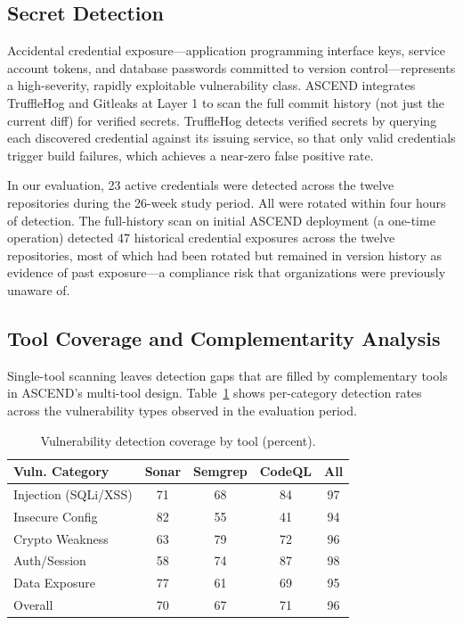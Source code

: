\documentclass{ieeeaccess}
\begin{document}
\subsection{Secret Detection}
Accidental credential exposure---application programming interface keys, service account tokens, and database passwords committed to version control---represents a high-severity, rapidly exploitable vulnerability class. ASCEND integrates TruffleHog and Gitleaks at Layer 1 to scan the full commit history (not just the current diff) for verified secrets. TruffleHog detects verified secrets by querying each discovered credential against its issuing service, so that only valid credentials trigger build failures, which achieves a near-zero false positive rate.

In our evaluation, 23 active credentials were detected across the twelve repositories during the 26-week study period. All were rotated within four hours of detection. The full-history scan on initial ASCEND deployment (a one-time operation) detected 47 historical credential exposures across the twelve repositories, most of which had been rotated but remained in version history as evidence of past exposure---a compliance risk that organizations were previously unaware of.

\subsection{Tool Coverage and Complementarity Analysis}
Single-tool scanning leaves detection gaps that are filled by complementary tools in ASCEND's multi-tool design. Table~\ref{tab:coverage} shows per-category detection rates across the vulnerability types observed in the evaluation period.

\begin{table}[!t]
\caption{Vulnerability detection coverage by tool (percent).}
\label{tab:coverage}
\centering
\begin{tabular}{lcccc}
\hline
\textbf{Vuln. Category} & \textbf{Sonar} & \textbf{Semgrep} & \textbf{CodeQL} & \textbf{All} \\
\hline
Injection (SQLi/XSS) & 71 & 68 & 84 & 97 \\
Insecure Config      & 82 & 55 & 41 & 94 \\
Crypto Weakness      & 63 & 79 & 72 & 96 \\
Auth/Session         & 58 & 74 & 87 & 98 \\
Data Exposure        & 77 & 61 & 69 & 95 \\
\hline
Overall              & 70 & 67 & 71 & 96 \\
\hline
\end{tabular}
\end{table}
\end{document}
